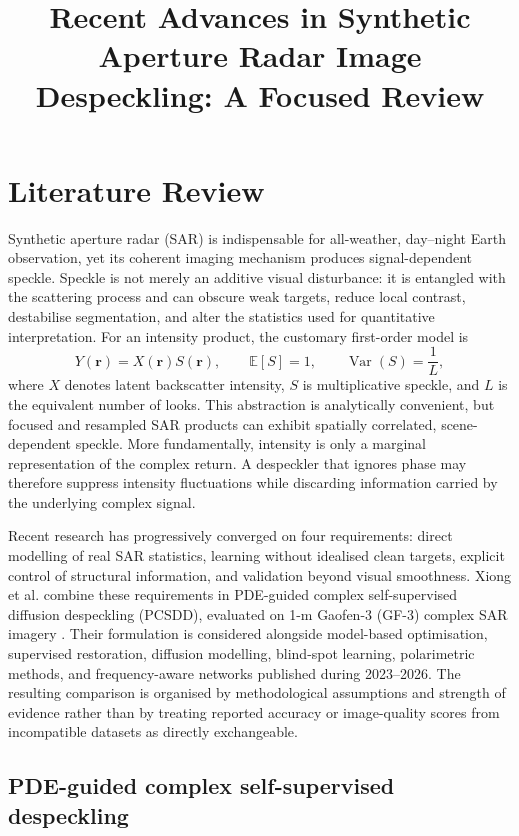\documentclass[11pt]{article}
\title{Recent Advances in Synthetic Aperture Radar Image Despeckling: A Focused Review}
\author{}
\date{}
\begin{document}
\maketitle

\section{Literature Review}

Synthetic aperture radar (SAR) is indispensable for all-weather, day--night Earth observation, yet its coherent imaging mechanism produces signal-dependent speckle. Speckle is not merely an additive visual disturbance: it is entangled with the scattering process and can obscure weak targets, reduce local contrast, destabilise segmentation, and alter the statistics used for quantitative interpretation. For an intensity product, the customary first-order model is
\begin{equation}
Y(\mathbf{r})=X(\mathbf{r})S(\mathbf{r}), \qquad
\mathbb{E}[S]=1, \qquad \operatorname{Var}(S)=\frac{1}{L},
\label{eq:speckle}
\end{equation}
where $X$ denotes latent backscatter intensity, $S$ is multiplicative speckle, and $L$ is the equivalent number of looks. This abstraction is analytically convenient, but focused and resampled SAR products can exhibit spatially correlated, scene-dependent speckle. More fundamentally, intensity is only a marginal representation of the complex return. A despeckler that ignores phase may therefore suppress intensity fluctuations while discarding information carried by the underlying complex signal.

Recent research has progressively converged on four requirements: direct modelling of real SAR statistics, learning without idealised clean targets, explicit control of structural information, and validation beyond visual smoothness. Xiong et al. combine these requirements in PDE-guided complex self-supervised diffusion despeckling (PCSDD), evaluated on 1-m Gaofen-3 (GF-3) complex SAR imagery \cite{Xiong2026PCSDD}. Their formulation is considered alongside model-based optimisation, supervised restoration, diffusion modelling, blind-spot learning, polarimetric methods, and frequency-aware networks published during 2023--2026. The resulting comparison is organised by methodological assumptions and strength of evidence rather than by treating reported accuracy or image-quality scores from incompatible datasets as directly exchangeable.

\subsection{PDE-guided complex self-supervised despeckling}
\end{document}
